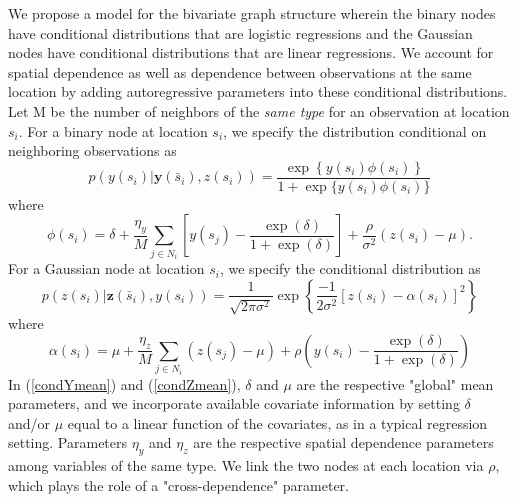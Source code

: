 \documentclass[12pt, a4paper, twoside]{article}
\begin{document}
We propose a model for the bivariate graph structure wherein the binary nodes have conditional distributions that are logistic regressions and the Gaussian nodes have conditional distributions that are linear regressions. We account for spatial dependence as well as dependence between observations at the same location by adding autoregressive parameters into these conditional distributions. Let M be the number of neighbors of the \textit{same type} for an observation at location $s_i$. For a binary node at location $s_i$, we specify the distribution conditional on neighboring observations as
\begin{equation} \label{condY}
p(y(s_{i})|\boldsymbol{y}(\bar{s}_i) , z(s_{i})) = \frac{\exp\left\lbrace y(s_i)\phi(s_i)  \right\rbrace}
{1 + \exp\lbrace y(s_i)\phi(s_i)\rbrace } 	
\end{equation}
where
\begin{equation} \label{condYmean}
\phi(s_i) = \delta + \frac{\eta_{y}}{M} \sum_{j \in N_{i}} \left[y(s_j) - \frac{\exp(\delta)}{1+\exp(\delta)}\right] +\frac{\rho}{\sigma^2}(z(s_i) - \mu)     .
\end{equation}
For a Gaussian node at location $s_i$, we specify the conditional distribution as 
\begin{equation}\label{condZ}
p(z(s_{i}) | \boldsymbol{z}(\bar{s}_i) , y(s_{i})) = \frac{1}{\sqrt {2 \pi \sigma^2}} \exp\left\lbrace \frac{-1}{2\sigma^2} \left[z(s_i) - \alpha(s_i)  \right]^{2} \right\rbrace 
\end{equation}
where
\begin{equation}\label{condZmean}
\alpha(s_i) =  \mu + \frac{\eta_z}{M} \sum_{j \in N_{i}} \left(z(s_j) - \mu\right)+ \rho\left(y(s_i) - \frac{\exp{(\delta)}}{1+\exp{(\delta)}}\right)
\end{equation}
In (\ref{condYmean}) and (\ref{condZmean}), $\delta$ and $\mu$ are the respective "global" mean parameters, and we incorporate available covariate information by setting $\delta$ and/or $\mu$ equal to a linear function of the covariates, as in a typical regression setting. Parameters $\eta_y$ and $\eta_z$ are the respective spatial dependence parameters among variables of the same type. We link the two nodes at each location via $\rho$, which plays the role of a "cross-dependence" parameter.
\end{document}
